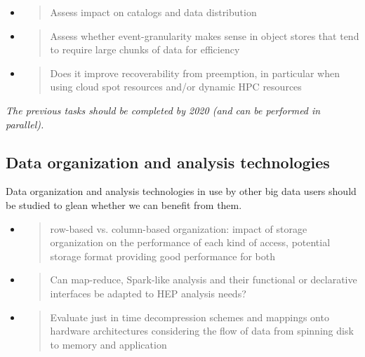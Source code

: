 \documentclass[12pt,a4paper]{article}
\begin{document}
\begin{itemize}
\item
  \begin{quote}
  \protect\hypertarget{_ox25y1bzr703}{}{}Assess impact on catalogs and
  data distribution
  \end{quote}
\end{itemize}

\begin{itemize}
\item
  \begin{quote}
  \protect\hypertarget{_hhvd696t4e1b}{}{}Assess whether
  event-granularity makes sense in object stores that tend to require
  large chunks of data for efficiency
  \end{quote}
\item
  \begin{quote}
  \protect\hypertarget{_hut1j5u624ly}{}{}Does it improve recoverability
  from preemption, in particular when using cloud spot resources and/or
  dynamic HPC resources
  \end{quote}
\end{itemize}

\emph{The previous tasks should be completed by 2020 (and can be performed in parallel).}

\subsection{Data organization and analysis
technologies}\label{data-organization-and-analysis}
Data organization and analysis technologies in use by other big data users should be
studied to glean whether we can benefit from them.

\begin{itemize}
\item
  \begin{quote}
  \protect\hypertarget{_2uzvesmlywml}{}{}row-based vs. column-based
  organization: impact of storage organization on the performance of
  each kind of access, potential storage format providing good
  performance for both
  \end{quote}
\item
  \begin{quote}
  \protect\hypertarget{_6xwv25emxnty}{}{}Can map-reduce, Spark-like
  analysis and their functional or declarative interfaces be adapted to
  HEP analysis needs?
  \end{quote}
\item
  \begin{quote}
  \protect\hypertarget{_vfqvjf8nrae}{}{}Evaluate just in time
  decompression schemes and mappings onto hardware architectures
  considering the flow of data from spinning disk to memory and
  application
  \end{quote}
\end{itemize}
\end{document}
